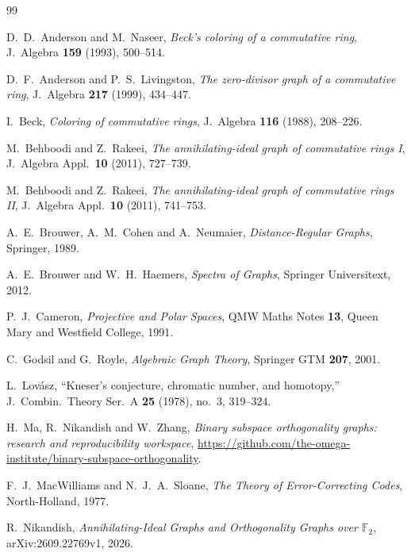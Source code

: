 \documentclass[11pt]{article}
\theoremstyle{remark}
\theoremstyle{definition}
\begin{document}
\begin{thebibliography}{99}
\raggedright

D.~D.~Anderson and M.~Naseer,
\emph{Beck's coloring of a commutative ring},
J.\ Algebra \textbf{159} (1993), 500--514.

D.~F.~Anderson and P.~S.~Livingston,
\emph{The zero-divisor graph of a commutative ring},
J.\ Algebra \textbf{217} (1999), 434--447.

I.~Beck,
\emph{Coloring of commutative rings},
J.\ Algebra \textbf{116} (1988), 208--226.

M.~Behboodi and Z.~Rakeei,
\emph{The annihilating-ideal graph of commutative rings I},
J.\ Algebra Appl.\ \textbf{10} (2011), 727--739.

M.~Behboodi and Z.~Rakeei,
\emph{The annihilating-ideal graph of commutative rings II},
J.\ Algebra Appl.\ \textbf{10} (2011), 741--753.

A.~E.~Brouwer, A.~M.~Cohen and A.~Neumaier,
\emph{Distance-Regular Graphs}, Springer, 1989.

A.~E.~Brouwer and W.~H.~Haemers,
\emph{Spectra of Graphs}, Springer Universitext, 2012.

P.~J.~Cameron,
\emph{Projective and Polar Spaces}, QMW Maths Notes \textbf{13},
Queen Mary and Westfield College, 1991.

C.~Godsil and G.~Royle,
\emph{Algebraic Graph Theory}, Springer GTM \textbf{207}, 2001.

L.~Lov\'asz,
``Kneser's conjecture, chromatic number, and homotopy,''
J.\ Combin.\ Theory Ser.\ A \textbf{25} (1978), no.~3, 319--324.

H.~Ma, R.~Nikandish and W.~Zhang,
\emph{Binary subspace orthogonality graphs: research and
reproducibility workspace},
\url{https://github.com/the-omega-institute/binary-subspace-orthogonality}.

F.~J.~MacWilliams and N.~J.~A.~Sloane,
\emph{The Theory of Error-Correcting Codes}, North-Holland, 1977.

R.~Nikandish,
\emph{Annihilating-Ideal Graphs and Orthogonality Graphs over
\(\mathbb F_2\)}, arXiv:2609.22769v1, 2026.

\end{thebibliography}
\end{document}
